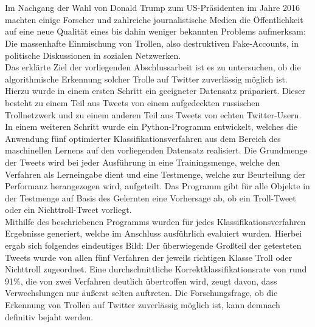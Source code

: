 \section*{}
Im Nachgang der Wahl von Donald Trump zum US-Präsidenten im Jahre 2016 machten einige Forscher und zahlreiche journalistische Medien die Öffentlichkeit auf eine neue Qualität eines bis dahin weniger bekannten Problems aufmerksam: Die massenhafte Einmischung von Trollen, also destruktiven Fake-Accounts, in politische Diskussionen in sozialen Netzwerken.\\
Das erklärte Ziel der vorliegenden Abschlussarbeit ist es zu untersuchen, ob die algorithmische Erkennung solcher Trolle auf Twitter zuverlässig möglich ist. Hierzu wurde in einem ersten Schritt ein geeigneter Datensatz präpariert. Dieser besteht zu einem Teil aus Tweets von einem aufgedeckten russischen Trollnetzwerk und zu einem anderen Teil aus Tweets von echten Twitter-Usern. In einem weiteren Schritt wurde ein Python-Programm entwickelt, welches die Anwendung fünf optimierter Klassifikationsverfahren aus dem Bereich des maschinellen Lernens auf den vorliegenden Datensatz realisiert. Die Grundmenge der Tweets wird bei jeder Ausführung in eine Trainingsmenge, welche den Verfahren als Lerneingabe dient und eine Testmenge, welche zur Beurteilung der Performanz herangezogen wird, aufgeteilt. Das Programm gibt für alle Objekte in der Testmenge auf Basis des Gelernten eine Vorhersage ab, ob ein Troll-Tweet oder ein Nichttroll-Tweet vorliegt.\\
Mithilfe des beschriebenen Programms wurden für jedes Klassifikationsverfahren Ergebnisse generiert, welche im Anschluss ausführlich evaluiert wurden. Hierbei ergab sich folgendes eindeutiges Bild: Der überwiegende Großteil der getesteten Tweets wurde von allen fünf Verfahren der jeweils richtigen Klasse Troll oder Nichttroll zugeordnet. Eine durchschnittliche Korrektklassifikationsrate von rund 91\%, die von zwei Verfahren deutlich übertroffen wird, zeugt davon, dass Verwechslungen nur äußerst selten auftreten. Die Forschungsfrage, ob die Erkennung von Trollen auf Twitter zuverlässig möglich ist, kann demnach definitiv bejaht werden.